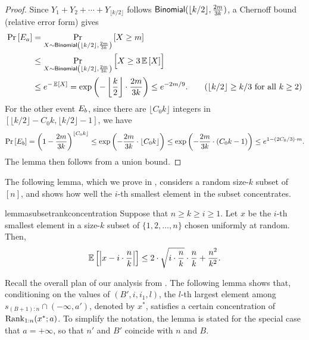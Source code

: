 \begin{proof}
    Since $Y_1 + Y_2 + \cdots + Y_{\lfloor k/2 \rfloor}$ follows $\mathsf{Binomial}(\lfloor k/2 \rfloor, \frac{2m}{3k})$, a Chernoff bound (relative error form) gives
    \begin{align*}
            \Pr_{}\left[E_a\right]
    &=      \Pr_{X\sim \mathsf{Binomial}\left(\lfloor k/2\rfloor, \frac{2m}{3k}\right)}\left[X \ge m\right]\\
    &\le    \Pr_{X\sim \mathsf{Binomial}\left(\lfloor k/2\rfloor, \frac{2m}{3k}\right)}\left[X \ge 3\operatorname*{\mathbb{E}}_{}\left[X\right]\right]\\
    &\le    e^{-\operatorname*{\mathbb{E}}_{}\left[X\right]}
    =       \exp\left(-\left\lfloor\frac{k}{2}\right\rfloor\cdot\frac{2m}{3k}\right)
    \le     e^{-2m/9}. \tag{$\lfloor k/2 \rfloor \ge k/3$ for all $k \ge 2$}
    \end{align*}
    For the other event $E_b$, since there are $\lfloor C_0 k\rfloor$ integers in $[\lfloor k/2 \rfloor - C_0 k, \lfloor k/2 \rfloor - 1]$, we have
    \[
        \Pr_{}\left[E_b\right]
    =   \left(1 - \frac{2m}{3k}\right)^{\lfloor C_0 k\rfloor}
    \le \exp\left(-\frac{2m}{3k}\cdot \lfloor C_0 k\rfloor\right)
    \le \exp\left(-\frac{2m}{3k}\cdot (C_0 k - 1)\right)
    \le e^{1-(2C_0 / 3)\cdot m}.
    \]
    The lemma then follows from a union bound.
\end{proof}
  
The following lemma, which we prove in , considers a random size-$k$ subset of $[n]$, and shows how well the $i$-th smallest element in the subset concentrates.

\begin{restatable}{lemma}{subsetrankconcentration}\label{lemma:subset-rank-concentration}
    Suppose that $n \ge k \ge i \ge 1$. Let $x$ be the $i$-th smallest element in a size-$k$ subset of $\{1, 2, \ldots, n\}$ chosen uniformly at random. Then,
    \[
        \operatorname*{\mathbb{E}}_{}\left[\left|x - i\cdot \frac{n}{k}\right|\right] \le 2\cdot \sqrt{i\cdot \frac{n}{k}}\cdot \frac{n}{k}+\frac{n^2}{k^2}.
    \]
\end{restatable}

Recall the overall plan of our analysis from . The following lemma shows that, conditioning on the values of $(B', i, i_1, l)$, the $l$-th largest element among $s_{(B+1):n} \cap (-\infty, a')$, denoted by $x^*$, satisfies a certain concentration of $\mathrm{Rank}_{1:n}(x^*; a)$. To simplify the notation, the lemma is stated for the special case that $a = +\infty$, so that $n'$ and $B'$ coincide with $n$ and $B$.

